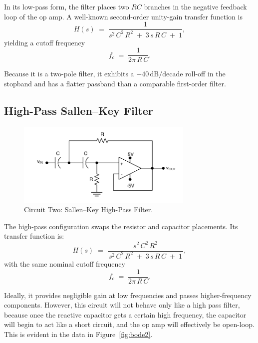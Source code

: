 \documentclass[12pt]{article}
\begin{document}
In its low-pass form, the filter places two $RC$ branches in the negative
feedback loop of the op amp. A well-known second-order unity-gain transfer
function is
\begin{equation*}
H(s) \;=\; \frac{1}{s^2\,C^2\,R^2 \;+\; 3\,s\,R\,C \;+\; 1},
\end{equation*}
yielding a cutoff frequency 
\begin{equation*}
f_c \;=\; \frac{1}{2\pi\,R\,C}.
\end{equation*}

Because it is a two-pole filter, it exhibits a $-40\,\mathrm{dB/decade}$ roll-off in the 
stopband and has a flatter passband than a comparable first-order filter.

\subsection{High-Pass Sallen--Key Filter}

\begin{figure}[H]
	\centering
	\includegraphics[width=0.75\textwidth]{07_highpass}
	\caption{Circuit Two: Sallen--Key High-Pass Filter.}
	\label{fig:highpass}
\end{figure}

The high-pass configuration swaps the resistor and capacitor placements. Its
transfer function is:
\begin{equation*}
H(s) \;=\; \frac{s^2\,C^2\,R^2}{\,s^2\,C^2\,R^2 \;+\; 3\,s\,R\,C \;+\; 1\,},
\end{equation*}
with the same nominal cutoff frequency
\begin{equation*}
f_c \;=\; \frac{1}{2\pi\,R\,C}.
\end{equation*}

Ideally, it provides negligible gain at low frequencies and passes 
higher-frequency components. However, this circuit will not behave only like a
high pass filter, because once the reactive capacitor gets a certain high
frequency, the capacitor will begin to act like a short circuit, and the op amp
will effectively be open-loop. This is evident in the data in
Figure~\ref{fig:bode2}.
\end{document}
